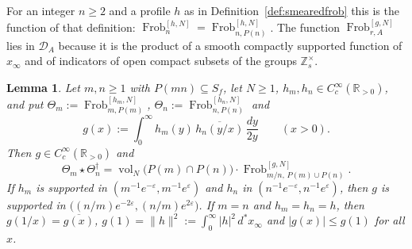 \documentclass[11pt]{amsart}
\newtheorem{lemma}[theorem]{Lemma}
\theoremstyle{definition}
\newcommand{\R}{\mathbb R}
\newcommand{\Z}{\mathbb Z}
\newcommand{\Frob}{\operatorname{Frob}}
\newcommand{\vol}{\operatorname{vol}}
\newcommand{\DA}{\mathcal D_A}
\begin{document}
For an integer $n\ge2$ and a profile $h$ as in
Definition~\ref{def:smearedfrob} this is the function of that definition:
$\Frob_n^{[h,N]}=\Frob_{n,P(n)}^{[h,N]}$. The function
$\Frob_{r,A}^{[g,N]}$ lies in $\DA$ because it is the product of a smooth
compactly supported function of $x_\infty$ and of indicators of open compact
subsets of the groups $\Z_s^\times$.

\begin{lemma}\label{lem:smearedproduct}
Let $m,n\ge1$ with $P(mn)\subseteq S_f$, let $N\ge1$,
$h_m,h_n\in C_c^\infty(\R_{>0})$, and put
$\Theta_m:=\Frob_{m,P(m)}^{[h_m,N]}$, $\Theta_n:=\Frob_{n,P(n)}^{[h_n,N]}$ and
\[
  g(x):=\int_0^\infty h_m(y)\,\overline{h_n(y/x)}\,\frac{dy}{2y}
  \qquad(x>0).
\]
Then $g\in C_c^\infty(\R_{>0})$ and
\begin{equation}\label{eq:gramconst}
  \Theta_m\star\Theta_n^\dagger=\vol_N\bigl(P(m)\cap P(n)\bigr)\cdot
   \Frob_{m/n,\,P(m)\cup P(n)}^{[g,N]} .
\end{equation}
If $h_m$ is supported in $(m^{-1}e^{-\varepsilon},m^{-1}e^{\varepsilon})$
and $h_n$ in $(n^{-1}e^{-\varepsilon},n^{-1}e^{\varepsilon})$, then $g$ is
supported in $\bigl((n/m)e^{-2\varepsilon},(n/m)e^{2\varepsilon}\bigr)$. If
$m=n$ and $h_m=h_n=h$, then $g(1/x)=\overline{g(x)}$,
$g(1)=\|h\|^2:=\int_0^\infty|h|^2\,d^*x_\infty$ and $|g(x)|\le g(1)$ for all
$x$.
\end{lemma}
\end{document}
